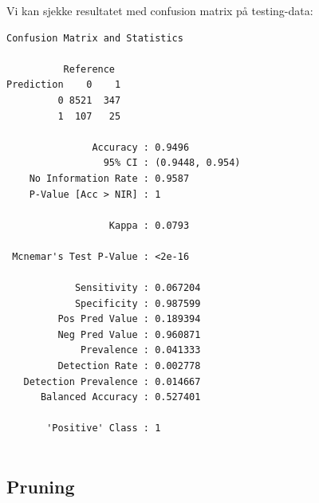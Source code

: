 \documentclass[
  letterpaper,
  DIV=11,
  numbers=noendperiod]{scrreprt}
\newenvironment{Shaded}{\begin{snugshade}}{\end{snugshade}}
\newcommand{\AttributeTok}[1]{\textcolor[rgb]{0.40,0.45,0.13}{#1}}
\newcommand{\FunctionTok}[1]{\textcolor[rgb]{0.28,0.35,0.67}{#1}}
\newcommand{\NormalTok}[1]{\textcolor[rgb]{0.00,0.23,0.31}{#1}}
\newcommand{\OtherTok}[1]{\textcolor[rgb]{0.00,0.23,0.31}{#1}}
\newcommand{\SpecialCharTok}[1]{\textcolor[rgb]{0.37,0.37,0.37}{#1}}
\newcommand{\StringTok}[1]{\textcolor[rgb]{0.13,0.47,0.30}{#1}}
\begin{document}
Vi kan sjekke resultatet med confusion matrix på testing-data:

\begin{Shaded}
\end{Shaded}

\begin{verbatim}
Confusion Matrix and Statistics

          Reference
Prediction    0    1
         0 8521  347
         1  107   25
                                         
               Accuracy : 0.9496         
                 95% CI : (0.9448, 0.954)
    No Information Rate : 0.9587         
    P-Value [Acc > NIR] : 1              
                                         
                  Kappa : 0.0793         
                                         
 Mcnemar's Test P-Value : <2e-16         
                                         
            Sensitivity : 0.067204       
            Specificity : 0.987599       
         Pos Pred Value : 0.189394       
         Neg Pred Value : 0.960871       
             Prevalence : 0.041333       
         Detection Rate : 0.002778       
   Detection Prevalence : 0.014667       
      Balanced Accuracy : 0.527401       
                                         
       'Positive' Class : 1              
                                         
\end{verbatim}

\subsection{Pruning}\label{pruning}
\end{document}
